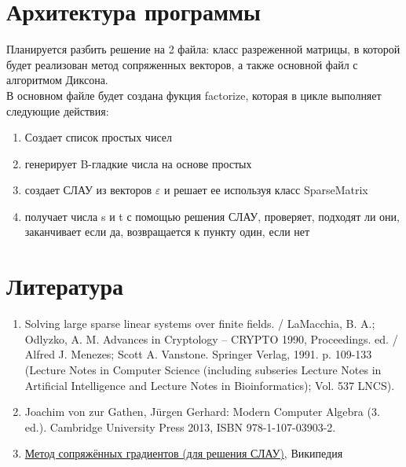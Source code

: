 \documentclass[14pt,a4paper,]{article}
\def\EPS{\varepsilon}         %
\begin{document}
    \section{Архитектура программы}
    Планируется разбить решение на 2 файла: класс разреженной матрицы, в которой будет реализован метод сопряженных векторов, а также основной файл с алгоритмом Диксона.\\
    В основном файле будет создана фукция factorize, которая в цикле выполняет следующие действия:
    \begin{enumerate}
        \item Создает список простых чисел
        \item генерирует B-гладкие числа на основе простых
        \item создает СЛАУ из векторов $\EPS$ и решает ее используя класс SparseMatrix
        \item получает числа s и t с помощью решения СЛАУ, проверяет, подходят ли они, заканчивает если да, возвращается к пункту один, если нет
    \end{enumerate}
    \section{Литература}
    \begin{enumerate}
        \item Solving large sparse linear systems over finite fields. / LaMacchia, B. A.; Odlyzko, A. M.
        Advances in Cryptology – CRYPTO 1990, Proceedings. ed. / Alfred J. Menezes; Scott A. Vanstone. Springer Verlag, 1991. p. 109-133 (Lecture Notes in Computer Science (including subseries Lecture Notes in Artificial Intelligence and Lecture Notes in Bioinformatics); Vol. 537 LNCS).
        \item Joachim von zur Gathen, Jürgen Gerhard: Modern Computer Algebra (3. ed.). Cambridge University Press 2013, ISBN 978-1-107-03903-2.
        \item \href{https://ru.wikipedia.org/wiki/%D0%9C%D0%B5%D1%82%D0%BE%D0%B4_%D1%81%D0%BE%D0%BF%D1%80%D1%8F%D0%B6%D1%91%D0%BD%D0%BD%D1%8B%D1%85_%D0%B3%D1%80%D0%B0%D0%B4%D0%B8%D0%B5%D0%BD%D1%82%D0%BE%D0%B2_(%D0%B4%D0%BB%D1%8F_%D1%80%D0%B5%D1%88%D0%B5%D0%BD%D0%B8%D1%8F_%D0%A1%D0%9B%D0%90%D0%A3)}{Метод сопряжённых градиентов (для решения СЛАУ)}, Википедия
    \end{enumerate}
\end{document}
